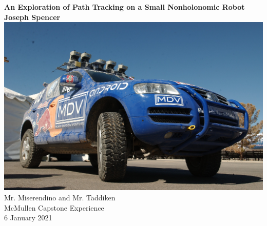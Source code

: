 \documentclass[12pt]{article}
\begin{document}
\begin{titlepage}
\begin{center}
\textbf{An Exploration of Path Tracking on a Small Nonholonomic Robot} \\
\vspace*{0.5cm}
\textbf{Joseph Spencer}\\
\vspace*{1cm}
\hspace*{-1.0in}
\includegraphics[width=1.3\linewidth]{images/Stanley}
Mr. Miserendino and Mr. Taddiken \\ McMullen Capstone Experience \\ 6 January 2021
\end{center}
\end{titlepage}

\newpage
\end{document}
